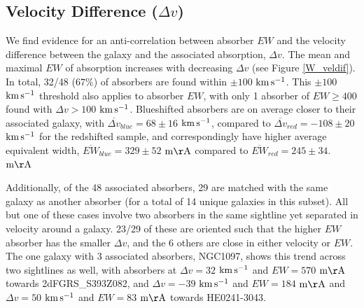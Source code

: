 \documentclass[iop]{emulateapj-rtx4}
\begin{document}


\subsection{Velocity Difference \rm($\Delta v$\rm)}

We find evidence for an anti-correlation between absorber $EW$ and the velocity difference between the galaxy and the associated absorption, $\Delta v$. The mean and maximal $EW$ of absorption increases with decreasing $\Delta v$ (see Figure \ref{W_veldif}). In total, 32/48 ($67\%$) of absorbers are found within $\pm100$ $\rm km\, s^{-1}$. This $\pm100$ $\rm km\, s^{-1}$ threshold also applies to absorber $EW$, with only 1 absorber of $EW \geq 400$ found with $\Delta v > 100$ $\rm km\, s^{-1}$. Blueshifted absorbers are on average closer to their associated galaxy, with $\overline{\Delta v}_{blue} = 68\pm16$ $\rm km\, s^{-1}$, compared to $\overline{\Delta v}_{red}=-108\pm20$ $\rm km\, s^{-1}$ for the redshifted sample, and correspondingly have higher average equivalent width, $\overline{EW}_{blue}=329\pm52$ $\rm m\AA$ compared to $\overline{EW}_{red}=245\pm34$. $\rm m\AA$

Additionally, of the 48 associated absorbers, 29 are matched with the same galaxy as another absorber (for a total of 14 unique galaxies in this subset). All but one of these cases involve two absorbers in the same sightline yet separated in velocity around a galaxy. 23/29 of these are oriented such that the higher $EW$ absorber has the smaller $\Delta v$, and the 6 others are close in either velocity or $EW$. The one galaxy with 3 associated absorbers, NGC1097, shows this trend across two sightlines as well, with absorbers at $\Delta v = 32$ $\rm km\, s^{-1}$ and $EW = 570$ $\rm m\AA$ towards 2dFGRS\_S393Z082, and $\Delta v = -39$ $\rm km\, s^{-1}$ and $EW = 184$ $\rm m\AA$ and $\Delta v = 50$ $\rm km\, s^{-1}$ and $EW = 83$ $\rm m\AA$ towards HE0241-3043.
\end{document}
